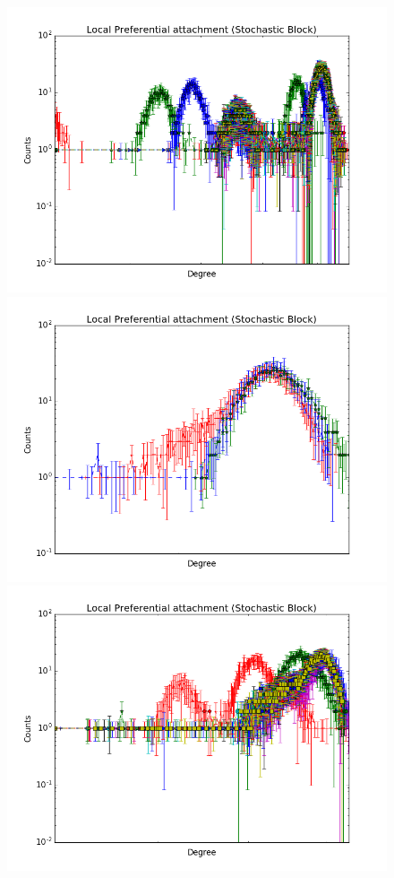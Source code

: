 \documentclass[a4paper, 12pt]{article}
\begin{document}
\begin{figure}[ht]
	\endminipage
		\vspace{-0.29cm}
	\includegraphics[scale=0.27]{img/ilfm/1/figure_3}
	\endminipage
	\includegraphics[scale=0.27]{img/ilfm/2/figure_3} 
	\endminipage
	\includegraphics[scale=0.27]{img/ilfm/3/figure_3}

\end{figure}
\end{document}
